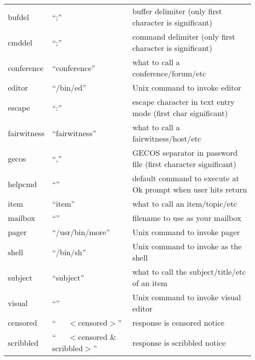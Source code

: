 \documentclass[twoside]{report}
\begin{document}
      \tablelasttail{\hline}
      \begin{supertabular}{lll}
      bufdel           & ``;''   
             & buffer delimiter (only first character is significant)\\
      cmddel           & ``;''   
             & command delimiter (only first character is significant)\\
      conference   & ``conference'' 
             & what to call a conference/forum/etc\\
      editor           & ``/bin/ed''    
             & Unix command to invoke editor \\
      escape           & ``:''          
             & escape character in text entry mode (first char significant)\\
      fairwitness & ``fairwitness'' 
             & what to call a fairwitness/host/etc\\
      gecos             & ``,''           
             & GECOS separator in password file (first character significant)\\
      helpcmd         & ``''            
             & default command to execute at Ok prompt when user hits return\\
      item               & ``item''        
             & what to call an item/topic/etc\\
      mailbox         & ``''            
             & filename to use as your mailbox\\
      pager             & ``/usr/bin/more''
             & Unix command to invoke pager\\
      shell             & ``/bin/sh''      
             & Unix command to invoke as the shell\\
      subject         & ``subject''      
             & what to call the subject/title/etc of an item\\
      visual           & ``''             
             & Unix command to invoke visual editor\\
      censored       & ``\ \ \ $<$censored$>$''
             & response is censored notice\\
      scribbled     & ``\ \ \ $<$censored \& scribbled$>$'' 
             & response is scribbled notice\\
      \end{supertabular}
\end{document}
